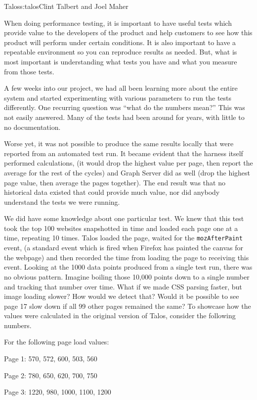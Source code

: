 \begin{aosachapter}{Talos}{s:talos}{Clint Talbert and Joel Maher}

When doing performance testing, it is important to have useful tests
which provide value to the developers of the product and help customers
to see how this product will perform under certain conditions. It is
also important to have a repeatable environment so you can reproduce
results as needed. But, what is most important is understanding what
tests you have and what you measure from those tests.

A few weeks into our project, we had all been learning more about the
entire system and started experimenting with various parameters to run
the tests differently. One recurring question was ``what do the numbers
mean?'' This was not easily answered. Many of the tests had been around
for years, with little to no documentation.

Worse yet, it was not possible to produce the same results locally that
were reported from an automated test run. It became evident that the
harness itself performed calculations, (it would drop the highest value
per page, then report the average for the rest of the cycles) and Graph
Server did as well (drop the highest page value, then average the pages
together). The end result was that no historical data existed that could
provide much value, nor did anybody understand the tests we were
running.

We did have some knowledge about one particular test. We knew that this
test took the top 100 websites snapshotted in time and loaded each page
one at a time, repeating 10 times. Talos loaded the page, waited for the
\texttt{mozAfterPaint} event, (a standard event which is fired when
Firefox has painted the canvas for the webpage) and then recorded the
time from loading the page to receiving this event. Looking at the 1000
data points produced from a single test run, there was no obvious
pattern. Imagine boiling those 10,000 points down to a single number and
tracking that number over time. What if we made CSS parsing faster, but
image loading slower? How would we detect that? Would it be possible to
see page 17 slow down if all 99 other pages remained the same? To
showcase how the values were calculated in the original version of
Talos, consider the following numbers.

For the following page load values:

\begin{aosaitemize}

\item
  Page 1: 570, 572, 600, 503, 560
\item
  Page 2: 780, 650, 620, 700, 750
\item
  Page 3: 1220, 980, 1000, 1100, 1200
\end{aosaitemize}


\end{aosachapter}
